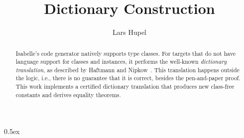 \documentclass[11pt,a4paper]{article}
\begin{document}
\title{Dictionary Construction}
\author{Lars Hupel}
\maketitle

\parindent 0pt\parskip 0.5ex

\begin{abstract}
  Isabelle's code generator natively supports type classes.
  For targets that do not have language support for classes and instances, it performs
  the well-known \emph{dictionary translation}, as described by Haftmann and
  Nipkow~\cite{haftmann2010codegeneration}.
  This translation happens outside the logic, i.e., there is no guarantee that it is correct,
  besides the pen-and-paper proof.
  This work implements a certified dictionary translation that produces new class-free constants and
  derives equality theorems.
\end{abstract}





\end{document}

